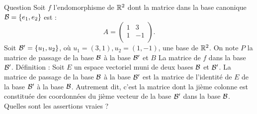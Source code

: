 \begin{multi}[multiple,feedback=
{Soit \(E\) un espace vectoriel de dimension finie, muni de deux bases \({\cal {B}}\) et \({\cal {B}}'\) 
et  \(P\) la matrice de passage de la base \({\cal {B}}\) à la base \({\cal {B}}'\). Soit \(f\) un endomorphisme de \(E\) de matrice 
\(A\) (resp. \(B\)) dans la base \({\cal {B}}\) (resp. \({\cal {B}}'\)).  
Alors, on a la relation : \(AP=PB\). De cette relation, on déduit que \(A^n=PB^nP^{-1}\). \(P^{-1}= \frac{1}{4}\left(\begin{array}{rc}
1&1\\ 1&-3\\ \end{array}\right)\),  \(B= \left(\begin{array}{rc}
2&0\\0&-2\\ \end{array}\right)\) et que
\[A^n= 2^{n-2}\left(\begin{array}{rc}3+(-1)^n&3-3(-1)^n\\
1-(-1)^n &1+3(-1)^n\end{array}\right),\mbox{  pour tout entier }n\ge1.\]
}]{Question}
Soit \(f\) l'endomorphisme de \(\mathbb{R}^2\) dont la matrice dans la base canonique \({\cal B}=\{e_1,e_2\}\) est : 
\[A=\left(\begin{array}{rc}1&3\\
1&-1\\ \end{array}\right).\]
Soit \({\cal B}' = \{ u_1, u_2\}\), où  \(u_1=(3,1), u_2=(1,-1)\), une base de \(\mathbb{R}^2\). On note \(P\) la matrice de passage de la base \({\cal B}\) à la base \({\cal B}'\) et \(B\) La matrice de \(f\) dans la base \({\cal B}'\).
\vskip1mm
Définition : Soit \(E\) un espace vectoriel muni de deux bases \({\cal {B}}\) et \({\cal {B}}'\). La matrice de passage de la base \({\cal {B}}\) à la base  \({\cal {B}}'\) est la matrice de l'identité de \(E\) de la base \({\cal {B}}'\) à la base  \({\cal {B}}\). Autrement dit, c'est la matrice dont la jième colonne est constituée des coordonnées du jième vecteur de la base \({\cal {B}'}\) dans la base  \({\cal {B}}\).
\vskip1mm
Quelles sont les assertions vraies ?


\end{multi}
